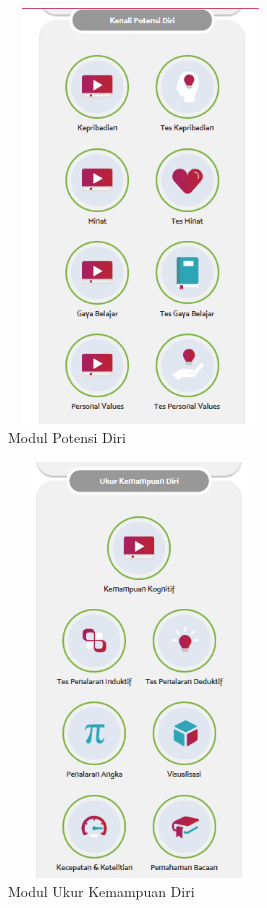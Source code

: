 \begin{enumerate}
    \begin{figure}[H]
        \centering
        \includegraphics[width = 7cm, height = 11cm ]{Gambar/gambar34.PNG}
        \caption{Modul Potensi Diri}
        \label{gambar34}
    \end{figure}
    
    \begin{figure}[H]
        \centering
        \includegraphics[width = 7cm, height = 11cm ]{Gambar/gambar35.PNG}
        \caption{Modul Ukur Kemampuan Diri}
        \label{gambar35}
    \end{figure}
    

\end{enumerate}
